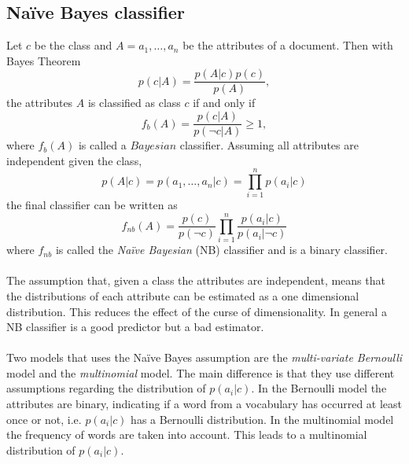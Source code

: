 \subsection{Naïve Bayes classifier}
Let $c$ be the class and $A = a_1, \dots ,a_n$ be the attributes of a document. Then with Bayes Theorem
\begin{equation}
p(c|A)=\frac{p(A|c)p(c)}{p(A)},
\end{equation}
the attributes $A$ is classified as class $c$ if and only if
\begin{equation}
f_b(A)=\frac{p(c|A)}{p(\neg c|A)} \geq 1,
\end{equation}
where $f_b(A)$ is called a $Bayesian$ classifier. Assuming all attributes are independent given the class, 
\[
p(A|c)=p(a_1,\dots ,a_n | c) = \prod_{i=1}^n p(a_i|c)
\]
the final classifier can be written as
\begin{equation}
f_{nb}(A) = \frac{p(c)}{p(\neg c)}\prod_{i=1}^n\frac{p(a_i|c)}{p(a_i|\neg c)}
\end{equation}
where $f_{nb}$ is called the \emph{Naïve Bayesian} (NB) classifier and is a binary classifier.\\\\
The assumption that, given a class the attributes are independent, means that the distributions of each attribute can be estimated as a one dimensional distribution. This reduces the effect of the curse of dimensionality. In general a NB classifier is a good predictor but a bad estimator. \cite{Zhang04optimality}\\\\
Two models that uses the Naïve Bayes assumption are the \emph{multi-variate Bernoulli} model and the \emph{multinomial} model. The main difference is that they use different assumptions regarding the distribution of $p(a_i|c)$. In the Bernoulli model the attributes are binary, indicating if a word from a vocabulary has occurred at least once or not, i.e. $p(a_i|c)$ has a Bernoulli distribution. In the multinomial model the frequency of words are taken into account. This leads to a multinomial distribution of $p(a_i|c)$. \cite{McCallum98acomparison}\cite{bernoulliDistr}\cite{multinomialDistr}